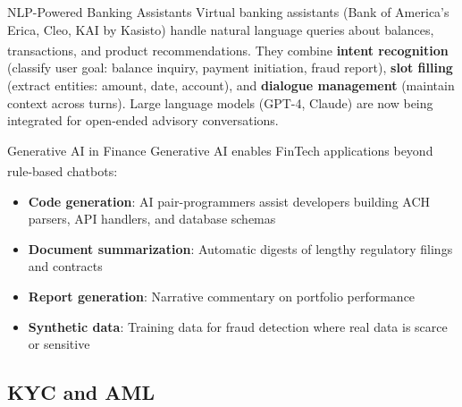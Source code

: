 \begin{v3topic}{NLP-Powered Banking Assistants}
    Virtual banking assistants (Bank of America's Erica, Cleo, KAI by Kasisto) handle natural language queries about balances, transactions, and product recommendations\textsuperscript{\cite[][p.~14]{kardellBuildFinancialSoftware2025}}.
    They combine \textbf{intent recognition} (classify user goal: balance inquiry, payment initiation, fraud report), \textbf{slot filling} (extract entities: amount, date, account), and \textbf{dialogue management} (maintain context across turns).
    Large language models (GPT-4, Claude) are now being integrated for open-ended advisory conversations.

\end{v3topic}
\begin{v3topic}{Generative AI in Finance}
    Generative AI enables FinTech applications beyond rule-based chatbots\textsuperscript{\cite[][pp.~13--15]{kardellBuildFinancialSoftware2025}}:
\visualseparator
    \begin{itemize}
        \item \textbf{Code generation}: AI pair-programmers assist developers building ACH parsers, API handlers, and database schemas
        \item \textbf{Document summarization}: Automatic digests of lengthy regulatory filings and contracts
        \item \textbf{Report generation}: Narrative commentary on portfolio performance
        \item \textbf{Synthetic data}: Training data for fraud detection where real data is scarce or sensitive
    \end{itemize}

\end{v3topic}

\subsection{KYC and AML}


